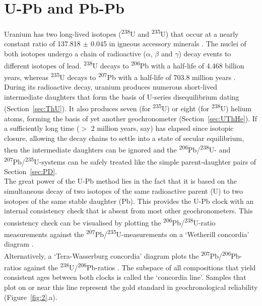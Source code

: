 \documentclass{article}
\begin{document}
\section{U-Pb and Pb-Pb}
\label{sec:UPb}

Uranium has two long-lived isotopes (\textsuperscript{238}U and
\textsuperscript{235}U) that occur at a nearly constant ratio of
137.818 $\pm$ 0.045 in igneous accessory minerals \citep{hiess2012}.
The nuclei of both isotopes undergo a chain of radioactive ($\alpha$,
$\beta$ and $\gamma$) decay events to different isotopes of
lead. \textsuperscript{238}U decays to \textsuperscript{206}Pb with a
half-life of 4.468 billion years, whereas \textsuperscript{235}U
decays to \textsuperscript{207}Pb with a half-life of 703.8 million
years \citep{jaffey1971}.\\

During its radioactive decay, uranium produces numerous short-lived
intermediate daughters that form the basis of U-series disequilibrium
dating (Section~\ref{sec:ThU}). It also produces seven (for
\textsuperscript{235}U) or eight (for \textsuperscript{238}U) helium
atoms, forming the basis of yet another geochronometer
(Section~\ref{sec:UThHe}). If a sufficiently long time ($>$ 2 million
years, say) has elapsed since isotopic closure, allowing the decay
chains to settle into a state of secular equilibrium, then the
intermediate daughters can be ignored and the
\textsuperscript{206}Pb/\textsuperscript{238}U- and
\textsuperscript{207}Pb/\textsuperscript{235}U-systems can be safely
treated like the simple parent-daughter pairs of
Section~\ref{sec:PD}.\\

The great power of the U-Pb method lies in the fact that it is based
on the simultaneous decay of two isotopes of the same radioactive
parent (U) to two isotopes of the same stable daughter (Pb).  This
provides the U-Pb clock with an internal consistency check that is
absent from most other geochronometers. This consistency check can be
visualised by plotting the
\textsuperscript{206}Pb/\textsuperscript{238}U-ratio measurements
against the
\textsuperscript{207}Pb/\textsuperscript{235}U-measurements on a
`Wetherill concordia' diagram \citep{wetherill1956}.\\

Alternatively, a `Tera-Wasserburg concordia' diagram plots the
\textsuperscript{207}Pb/\textsuperscript{206}Pb-ratios against the
\textsuperscript{238}U/\textsuperscript{206}Pb-ratios
\citep{tera1972}. The subspace of all compositions that yield
consistent ages between both clocks is called the `concordia line'.
Samples that plot on or near this line represent the gold standard in
geochronological reliability (Figure~\ref{fig:2}.a).\\
\end{document}
